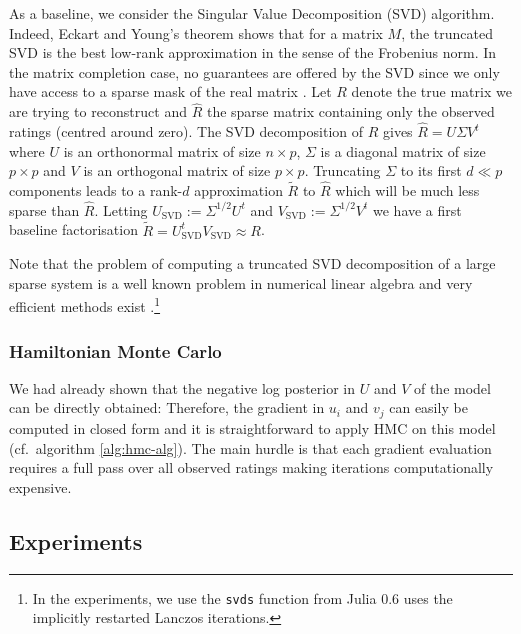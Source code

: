 As a baseline, we consider the Singular Value Decomposition (SVD) algorithm. Indeed, Eckart and Young's theorem shows that for a matrix $M$, the truncated SVD is the best low-rank approximation in the sense of the Frobenius norm. In the matrix completion case, no guarantees are offered by the SVD since we only have access to a sparse mask of the real matrix \citep{srebro04}. Let $R$ denote the true matrix we are trying to reconstruct and $\hat R$ the sparse matrix containing only the observed ratings (centred around zero). The SVD decomposition of $\hat R$ gives $\hat R = U\Sigma V^{t}$ where $U$ is an orthonormal matrix of size $n\times p$, $\Sigma$ is a diagonal matrix of size $p\times p$ and $V$ is an orthogonal matrix of size $p\times p$. Truncating $\Sigma$ to its first $d\ll p$ components leads to a rank-$d$ approximation $\tilde R$ to $\hat R$ which will be much less sparse than $\hat R$. 
Letting $U_{\text{SVD}}:=\Sigma^{1/2}U^{t}$ and $V_{\text{SVD}}:=\Sigma^{1/2}V^{t}$ we have a first baseline factorisation $\tilde R=U_{\text{SVD}}^{t}V_{\text{SVD}}\approx R$.

Note that the problem of computing a truncated SVD decomposition of a large sparse system is a well known problem in numerical linear algebra and very efficient methods exist \citep{sorensen96}.\footnote{In the experiments, we use the \texttt{svds} function from Julia 0.6 uses the implicitly restarted Lanczos iterations.} 

\subsubsection{Hamiltonian Monte Carlo}

We had already shown that the negative log posterior in $U$ and $V$ of the model can be directly obtained:
Therefore, the gradient in $u_{i}$ and $v_{j}$ can easily be computed in closed form and it is straightforward to apply HMC on this model (cf.\ algorithm \ref{alg:hmc-alg}). The main hurdle is that each gradient evaluation requires a full pass over all observed ratings making iterations computationally expensive. 

\subsection{Experiments}

